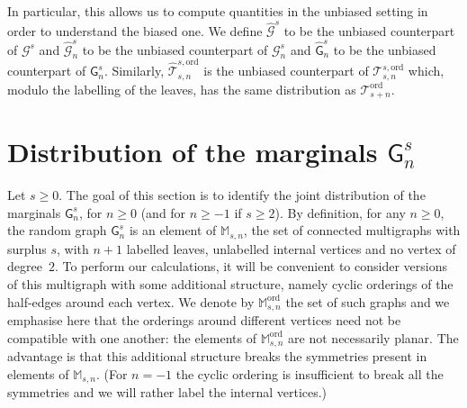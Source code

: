 \documentclass[10pt]{amsart}
\theoremstyle{definition}\newtheorem{defi}[theo]{Definition}\newtheorem{rema}[theo]{Remark}\newtheorem{exam}[theo]{Example}\newtheorem{exem}[theo]{Example}\newtheorem{nota}[theo]{Notation}
\newcommand{\intervalle}[4]{\mathopen{#1}#2
\mathclose{}\mathpunct{},#3
\mathclose{#4}}
\newcommand{\intervalleff}[2]{\intervalle{[}{#1}{#2}{]}}
\newcommand{\E}[1]{\ensuremath{\mathbb{E} \left[#1 \right]}}
\newcommand{\ord}{\mathrm{ord}}
\newcommand{\cG}{\mathcal{G}}
\newcommand{\cT}{\mathcal{T}}
\newcommand{\sG}{\mathsf{G}}
\newcommand{\M}{\mathbb{M}}
\begin{document}
In particular, this allows us to compute quantities in the unbiased setting in order to understand the biased one. We define $\widehat{\cG}^s$ to be the unbiased counterpart of $\cG^s$ and $\widehat{\cG}^s_n$ to be the unbiased counterpart of $\cG^s_n$ and $\widehat{\sG}^s_n$ to be the unbiased counterpart of $\sG_n^s$. Similarly, $\widehat{\cT}_{s,n}^{s,\ord}$ is the unbiased counterpart of $\cT_{s,n}^{s,\ord}$ which, modulo the labelling of the leaves, has the same distribution as $\cT_{s+n}^{\ord}$.



\section{Distribution of the marginals \texorpdfstring{$\sG_{n}^s$}{mathsfGns}}\label{sec:marginals}

Let $s \geq 0$. The goal of this section is to identify the joint distribution of the marginals $\sG^s_{n}$, for $n \geq 0$ (and for $n \ge -1$ if $s \ge 2$). By definition, for any $n \geq 0$, the random graph $\sG^s_{n}$ is an element of $\M_{s,n}$, the set of connected multigraphs with surplus $s$, with $n+1$ labelled leaves, unlabelled internal vertices and no vertex of degree~$2$. To perform our calculations, it will be convenient to consider versions of this multigraph with some additional structure, namely cyclic orderings of the half-edges around each vertex. We denote by $\M_{s,n}^{\ord}$ the set of such graphs and we emphasise here that the orderings around different vertices need not be compatible with one another: the elements of $\M^{\ord}_{s,n}$ are not necessarily planar. The advantage is that this additional structure breaks the symmetries present in elements of $\M_{s,n}$. (For $n=-1$ the cyclic ordering is insufficient to break all the symmetries and we will rather label the internal vertices.)
\end{document}
